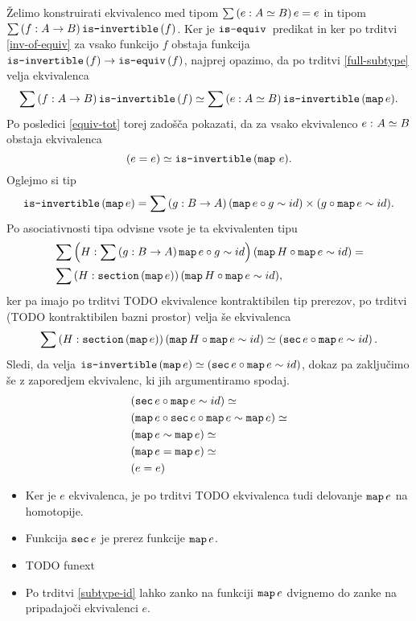 \begin{dokaz}
  Želimo konstruirati ekvivalenco med tipom \(\sumtype{e}{A \simeq B}{e = e}\) in tipom
  \(\sumtype{f}{A \to B}{\isinv(f)}\).
  Ker je \(\isequiv\) predikat in ker po trditvi \ref{inv-of-equiv}
  za vsako funkcijo \(f\) obstaja funkcija
  \(\typename{is-invertible}(f) \to \typename{is-equiv}(f)\), najprej opazimo, da po
  trditvi \ref{full-subtype} velja ekvivalenca
  \[\sumtype{f}{A \to B}{\isinv(f)} \simeq
    \sumtype{e}{A \simeq B}{\isinv(\map e).}
  \]
  Po posledici \ref{equiv-tot}
  torej zadošča pokazati, da za vsako ekvivalenco \(\dequiv{e}{A}{B}\) obstaja ekvivalenca
  \[(e = e) \simeq \isinv(\map \, e).\]
  Oglejmo si tip \[\isinv(\map e) = \sumtype{g}{B \to A}{(\map e \circ g \sim id) \times (g \circ \map e \sim id)}.\] Po
  asociativnosti tipa odvisne vsote je ta ekvivalenten tipu
  \begin{align*}
    & \sumtype{H}{\sumtype{g}{B \to A}{\map e \circ g \sim id}}{(\map H \circ \map e \sim id)} = \\
    & \sumtype{H}{\typename{section}(\map e)}{(\map H \circ \map e \sim id)},
  \end{align*}
  ker pa imajo po trditvi TODO ekvivalence kontraktibilen tip prerezov, po trditvi
  (TODO kontraktibilen bazni prostor) velja še ekvivalenca
  \[\sumtype{H}{\typename{section}(\map e)}{(\map H \circ \map e \sim id)} \simeq
    \left(\typename{sec} e \circ \map e \sim id\right).\]
  Sledi, da velja \(\isinv(\map e) \simeq (\typename{sec} e \circ \map e \sim id)\), dokaz pa
  zaključimo še z zaporedjem ekvivalenc, ki jih argumentiramo spodaj.
  \begin{align*}
    & (\typename{sec} e \circ \map e \sim id) \simeq \\
    & (\map e \circ \typename{sec}e \circ \map e \sim \map e) \simeq \\
    & (\map e \sim \map e) \simeq \\
    & (\map e = \map e) \simeq \\
    & (e = e)
  \end{align*}
  \begin{itemize}
  \item Ker je \(e\) ekvivalenca, je po trditvi TODO ekvivalenca tudi delovanje \(\map e\)
    na homotopije.
  \item Funkcija \(\typename{sec}e\) je prerez funkcije \(\map e\).
  \item TODO funext
  \item Po trditvi \ref{subtype-id} lahko zanko na funkciji \(\map e\) dvignemo do
    zanke na pripadajoči ekvivalenci \(e\).
  \end{itemize}
\end{dokaz}



